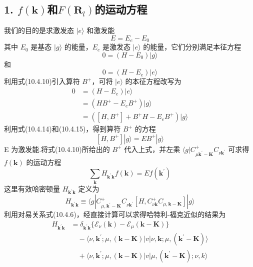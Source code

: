 \subsection*{1. $f(\boldsymbol{k})$和$F(\boldsymbol{R}_{l})$的运动方程}

我们的目的是求激发态 $|e\rangle$ 和激发能
\begin{equation}
  E=E_{e}-E_{0}
\end{equation}
其中 $E_{0}$ 是基态 $|g\rangle$ 的能量，$E_{e}$ 是激发态 $|e\rangle$ 的能量，它们分别满足本征方程
\begin{equation}
  0=\left(H-E_{0}\right)|g\rangle
\end{equation}
和
\begin{equation}
  0=\left(H-E_{e}\right)|e\rangle
\end{equation}
利用式(10.4.10)引入算符 $B^{+}$，可将 $|e\rangle$ 的本征方程改写为
\begin{equation}
\begin{aligned}
  0&=\left(H-E_{e}\right)|e\rangle\\
  &=\left(HB^{+}-E_{e}B^{+}\right)|g\rangle\\
  &=\left(\left[H,B^{+}\right]+B^{+}H-E_{e}B^{+}\right)|g\rangle
\end{aligned}
\end{equation}
利用式(10.4.14)和(10.4.15)，得到算符 $B^{+}$ 的方程
\begin{equation}
  \left[H,B^{+}\right]|g\rangle=EB^{+}|g\rangle
\end{equation}
E 为激发能.将式(10.4.10)所给出的 $B^{+}$ 代入上式，并左乘 $\langle g|C_{\mu\boldsymbol{k}^{\prime}-\boldsymbol{K}}^{+}C_{\nu\boldsymbol{k}^{\prime}}$ 可求得 $f(\boldsymbol{k})$ 的运动方程
\begin{equation}
  \sum_{\boldsymbol{k}}H_{\boldsymbol{k}^{\prime}\boldsymbol{k}}f(\boldsymbol{k})
  =Ef(\boldsymbol{k}^{\prime})
\end{equation}
这里有效哈密顿量 $H_{\boldsymbol{k}^{\prime}\boldsymbol{k}}$ 定义为
\begin{equation}
  H_{\boldsymbol{k}^{\prime}\boldsymbol{k}}\equiv\langle g|
  C_{\mu,\boldsymbol{k}^{\prime}-\boldsymbol{K}}^{+}C_{\nu\boldsymbol{k}^{\prime}}
  \left[H,C_{\nu\boldsymbol{k}}^{+}C_{\mu,\boldsymbol{k}-\boldsymbol{K}}\right]|g\rangle
\end{equation}
利用对易关系式(10.4.6)，经直接计算可以求得哈特利-福克近似的结果为
\begin{equation}
\begin{aligned}
  H_{\boldsymbol{k}^{\prime}\boldsymbol{k}}
  &=\delta_{\boldsymbol{k}^{\prime}\boldsymbol{k}}\{\mathscr{E}_{\nu}(\boldsymbol{k})
  -\mathscr{E}_{\mu}(\boldsymbol{k}-\boldsymbol{K})\}\\
  &\quad-\langle\nu,\boldsymbol{k}^{\prime};\mu,(\boldsymbol{k}-\boldsymbol{K})|v|
  \nu,\boldsymbol{k};\mu,(\boldsymbol{k}^{\prime}-\boldsymbol{K})\rangle\\
  &\quad+\langle\nu,\boldsymbol{k}^{\prime};\mu,(\boldsymbol{k}-\boldsymbol{K})|v|
  \mu,(\boldsymbol{k}^{\prime}-\boldsymbol{K});\nu,k\rangle
\end{aligned}
\end{equation}
